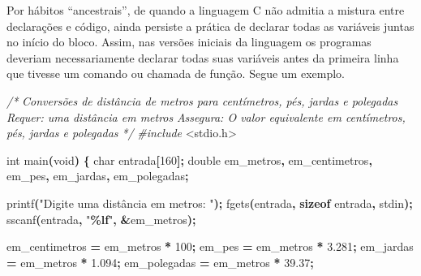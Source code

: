 \documentclass[
  11pt,
  a4paper,
]{scrbook}
\newenvironment{Shaded}{\begin{snugshade}}{\end{snugshade}}
\newcommand{\CommentTok}[1]{\textcolor[rgb]{0.56,0.35,0.01}{\textit{#1}}}
\newcommand{\DataTypeTok}[1]{\textcolor[rgb]{0.13,0.29,0.53}{#1}}
\newcommand{\DecValTok}[1]{\textcolor[rgb]{0.00,0.00,0.81}{#1}}
\newcommand{\FloatTok}[1]{\textcolor[rgb]{0.00,0.00,0.81}{#1}}
\newcommand{\ImportTok}[1]{#1}
\newcommand{\KeywordTok}[1]{\textcolor[rgb]{0.13,0.29,0.53}{\textbf{#1}}}
\newcommand{\NormalTok}[1]{#1}
\newcommand{\OperatorTok}[1]{\textcolor[rgb]{0.81,0.36,0.00}{\textbf{#1}}}
\newcommand{\PreprocessorTok}[1]{\textcolor[rgb]{0.56,0.35,0.01}{\textit{#1}}}
\newcommand{\SpecialCharTok}[1]{\textcolor[rgb]{0.81,0.36,0.00}{\textbf{#1}}}
\newcommand{\StringTok}[1]{\textcolor[rgb]{0.31,0.60,0.02}{#1}}
\begin{document}
Por hábitos ``ancestrais'', de quando a linguagem C não admitia a
mistura entre declarações e código, ainda persiste a prática de declarar
todas as variáveis juntas no início do bloco. Assim, nas versões
iniciais da linguagem os programas deveriam necessariamente declarar
todas suas variáveis antes da primeira linha que tivesse um comando ou
chamada de função. Segue um exemplo.

\begin{Shaded}
\begin{Highlighting}[]
\CommentTok{/*}
\CommentTok{Conversões de distância de metros para centímetros, pés, jardas e polegadas}
\CommentTok{Requer: uma distância em metros}
\CommentTok{Assegura: O valor equivalente em centímetros, pés, jardas e polegadas}
\CommentTok{*/}
\PreprocessorTok{\#include }\ImportTok{\textless{}stdio.h\textgreater{}}

\DataTypeTok{int}\NormalTok{ main}\OperatorTok{(}\DataTypeTok{void}\OperatorTok{)} \OperatorTok{\{}
    \DataTypeTok{char}\NormalTok{ entrada}\OperatorTok{[}\DecValTok{160}\OperatorTok{];}
    \DataTypeTok{double}\NormalTok{ em\_metros}\OperatorTok{,}\NormalTok{ em\_centimetros}\OperatorTok{,}\NormalTok{ em\_pes}\OperatorTok{,}\NormalTok{ em\_jardas}\OperatorTok{,}\NormalTok{ em\_polegadas}\OperatorTok{;}

\NormalTok{    printf}\OperatorTok{(}\StringTok{"Digite uma distância em metros: "}\OperatorTok{);}
\NormalTok{    fgets}\OperatorTok{(}\NormalTok{entrada}\OperatorTok{,} \KeywordTok{sizeof}\NormalTok{ entrada}\OperatorTok{,}\NormalTok{ stdin}\OperatorTok{);}
\NormalTok{    sscanf}\OperatorTok{(}\NormalTok{entrada}\OperatorTok{,} \StringTok{"}\SpecialCharTok{\%lf}\StringTok{"}\OperatorTok{,} \OperatorTok{\&}\NormalTok{em\_metros}\OperatorTok{);}

\NormalTok{    em\_centimetros }\OperatorTok{=}\NormalTok{ em\_metros }\OperatorTok{*} \DecValTok{100}\OperatorTok{;}
\NormalTok{    em\_pes }\OperatorTok{=}\NormalTok{ em\_metros }\OperatorTok{*} \FloatTok{3.281}\OperatorTok{;}
\NormalTok{    em\_jardas }\OperatorTok{=}\NormalTok{ em\_metros }\OperatorTok{*} \FloatTok{1.094}\OperatorTok{;}
\NormalTok{    em\_polegadas }\OperatorTok{=}\NormalTok{ em\_metros }\OperatorTok{*} \FloatTok{39.37}\OperatorTok{;}


\end{Highlighting}
\end{Shaded}
\end{document}
